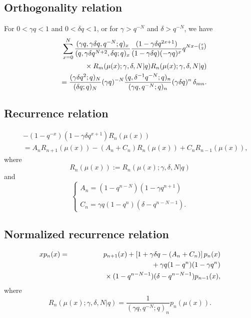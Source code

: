 \documentclass[envcountchap,graybox]{svmono}
\newcommand{\mathindent}{\hspace{7.5mm}}
\begin{document}
\newpage

\subsection*{Orthogonality relation}
For $0<\gamma q<1$ and $0<\delta q<1$, or for $\gamma>q^{-N}$ and $\delta>q^{-N}$, we have
\begin{eqnarray}
\label{OrtDualqHahn}
& &\sum_{x=0}^N\frac{(\gamma q,\gamma\delta q,q^{-N};q)_x}{(q,\gamma\delta q^{N+2},\delta q;q)_x}
\frac{(1-\gamma\delta q^{2x+1})}{(1-\gamma\delta q)(-\gamma q)^x}q^{Nx-\binom{x}{2}}\nonumber\\
& &{}\mathindent{}\times R_m(\mu(x);\gamma,\delta,N|q)R_n(\mu(x);\gamma,\delta,N|q)\nonumber\\
& &{}=\frac{(\gamma\delta q^2;q)_N}{(\delta q;q)_N}(\gamma q)^{-N}
\frac{(q,\delta^{-1}q^{-N};q)_n}{(\gamma q,q^{-N};q)_n}(\gamma\delta q)^n\,\delta_{mn}.
\end{eqnarray}

\subsection*{Recurrence relation}
\begin{eqnarray}
\label{RecDualqHahn}
& &-\left(1-q^{-x}\right)\left(1-\gamma\delta q^{x+1}\right)R_n(\mu(x))\nonumber\\
& &{}=A_nR_{n+1}(\mu(x))-\left(A_n+C_n\right)R_n(\mu(x))+C_nR_{n-1}(\mu(x)),
\end{eqnarray}
where
$$R_n(\mu(x)):=R_n(\mu(x);\gamma,\delta,N|q)$$
and
$$\left\{\begin{array}{l}
\displaystyle A_n=\left(1-q^{n-N}\right)\left(1-\gamma q^{n+1}\right)\\
\\
\displaystyle C_n=\gamma q\left(1-q^n\right)\left(\delta -q^{n-N-1}\right).
\end{array}\right.$$

\subsection*{Normalized recurrence relation}
\begin{eqnarray}
\label{NormRecDualqHahn}
xp_n(x)&=&p_{n+1}(x)+\left[1+\gamma\delta q-(A_n+C_n)\right]p_n(x)\nonumber\\
& &{}\mathindent{}+\gamma q(1-q^n)(1-\gamma q^n)\nonumber\\
& &{}\mathindent\mathindent{}\times(1-q^{n-N-1})(\delta-q^{n-N-1})p_{n-1}(x),
\end{eqnarray}
where
$$R_n(\mu(x);\gamma,\delta,N|q)=\frac{1}{(\gamma q,q^{-N};q)_n}p_n(\mu(x)).$$
\end{document}
